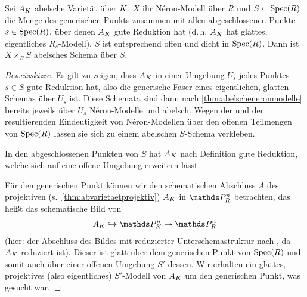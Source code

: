 \begin{Satz}\label{thm:teilwabelscheneronmodelle}
  Sei $A_{K}$ abelsche Varietät über $K$,
  $X$ ihr Néron-Modell über $R$ und
  $S\subset\operatorname{Spec}(R)$ die Menge des generischen Punkts zusammen mit
  allen abgeschlossenen Punkte $s\in\operatorname{Spec}(R)$, über denen $A_{K}$ gute
  Reduktion hat (d.\,h. $A_{K}$ hat glattes, eigentliches $R_s$-Modell).
  $S$ ist entsprechend offen und dicht in $\operatorname{Spec}(R)$.
  Dann ist $X\times_R S$ abelsches Schema über $S$.
  \begin{proof}[Beweisskizze]
    Es gilt zu zeigen, dass $A_{K}$ in einer Umgebung $U_s$ jedes
    Punktes $s\in S$ gute Reduktion hat, also die generische Faser eines
    eigentlichen, glatten Schemas über $U_s$ ist.
    Diese Schemata sind dann nach \ref{thm:abelscheneronmodelle}
    bereits jeweils über $U_s$ Néron-Modelle und abelsch.
    Wegen der \NAbbEig und der resultierenden Eindeutigkeit von
    Néron-Modellen über den offenen Teilmengen von $\operatorname{Spec}(R)$
    lassen sie sich zu einem abelschen $S$-Schema verkleben.

    In den abgeschlossenen Punkten von $S$ hat $A_{K}$ nach Definition
    gute Reduktion, welche sich auf eine offene Umgebung erweitern
    lässt.
    
    Für den generischen Punkt können wir den schematischen
    Abschluss $A$ des projektiven (s.~\ref{thm:abvarietaetprojektiv})
    $A_{K}$ in $\P_R^n$ betrachten, das heißt das schematische Bild von
    \begin{gather*}
      A_\K\hookrightarrow\P_\K^n\to\P_R^n
    \end{gather*}
    (hier: der Abschluss des Bildes mit reduzierter
    Unterschemastruktur nach \cite[Remark 10.32]{wedhorn}, da $A_{K}$
    reduziert ist).
    Dieser ist glatt über dem generischen Punkt von $\operatorname{Spec}(R)$
    und somit auch über einer offenen Umgebung $S'$ dessen.
    Wir erhalten ein glattes, projektives (also eigentliches)
    $S'$-Modell von $A_{K}$ um den generischen Punkt, was gesucht war.
  \end{proof}
\end{Satz}



